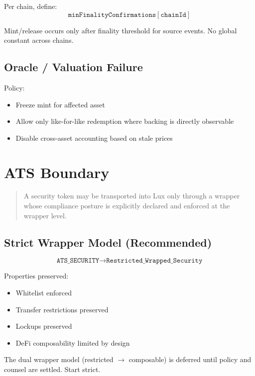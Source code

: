 \documentclass[11pt,a4paper]{article}
\begin{document}
Per chain, define:
$$\texttt{minFinalityConfirmations}[\texttt{chainId}]$$

Mint/release occurs only after finality threshold for source events. No global constant across chains.

\subsection{Oracle / Valuation Failure}

Policy:
\begin{itemize}[leftmargin=2em]
\item Freeze mint for affected asset
\item Allow only like-for-like redemption where backing is directly observable
\item Disable cross-asset accounting based on stale prices
\end{itemize}

\section{ATS Boundary}

\begin{quote}
A security token may be transported into Lux only through a wrapper whose compliance posture is explicitly declared and enforced at the wrapper level.
\end{quote}

\subsection{Strict Wrapper Model (Recommended)}

$$\texttt{ATS\_SECURITY} \to \texttt{Restricted\_Wrapped\_Security}$$

Properties preserved:
\begin{itemize}[leftmargin=2em]
\item Whitelist enforced
\item Transfer restrictions preserved
\item Lockups preserved
\item DeFi composability limited by design
\end{itemize}

The dual wrapper model (restricted $\to$ composable) is deferred until policy and counsel are settled. Start strict.

\end{document}
